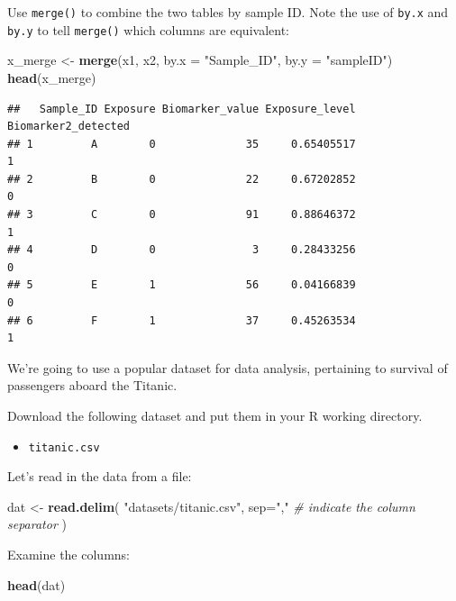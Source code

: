 \documentclass[
]{book}
\newenvironment{Shaded}{\begin{snugshade}}{\end{snugshade}}
\newcommand{\AttributeTok}[1]{\textcolor[rgb]{0.13,0.29,0.53}{#1}}
\newcommand{\CommentTok}[1]{\textcolor[rgb]{0.56,0.35,0.01}{\textit{#1}}}
\newcommand{\FunctionTok}[1]{\textcolor[rgb]{0.13,0.29,0.53}{\textbf{#1}}}
\newcommand{\NormalTok}[1]{#1}
\newcommand{\OtherTok}[1]{\textcolor[rgb]{0.56,0.35,0.01}{#1}}
\newcommand{\StringTok}[1]{\textcolor[rgb]{0.31,0.60,0.02}{#1}}
\providecommand{\tightlist}{%
  \setlength{\itemsep}{0pt}\setlength{\parskip}{0pt}}
\begin{document}
Use \texttt{merge()} to combine the two tables by sample ID. Note the use of \texttt{by.x} and \texttt{by.y} to tell \texttt{merge()} which columns are equivalent:

\begin{Shaded}
\begin{Highlighting}[]
\NormalTok{x\_merge }\OtherTok{\textless{}{-}} \FunctionTok{merge}\NormalTok{(x1, x2, }\AttributeTok{by.x =} \StringTok{"Sample\_ID"}\NormalTok{, }\AttributeTok{by.y =} \StringTok{"sampleID"}\NormalTok{)}
\FunctionTok{head}\NormalTok{(x\_merge)}
\end{Highlighting}
\end{Shaded}

\begin{verbatim}
##   Sample_ID Exposure Biomarker_value Exposure_level Biomarker2_detected
## 1         A        0              35     0.65405517                   1
## 2         B        0              22     0.67202852                   0
## 3         C        0              91     0.88646372                   1
## 4         D        0               3     0.28433256                   0
## 5         E        1              56     0.04166839                   0
## 6         F        1              37     0.45263534                   1
\end{verbatim}

We're going to use a popular dataset for data analysis, pertaining to survival of passengers aboard the Titanic.

Download the following dataset and put them in your R working directory.

\begin{itemize}
\tightlist
\item
  \texttt{titanic.csv}
\end{itemize}

Let's read in the data from a file:

\begin{Shaded}
\begin{Highlighting}[]
\NormalTok{dat }\OtherTok{\textless{}{-}} \FunctionTok{read.delim}\NormalTok{(}
    \StringTok{"datasets/titanic.csv"}\NormalTok{,}
    \AttributeTok{sep=}\StringTok{","} \CommentTok{\# indicate the column separator}
\NormalTok{    ) }
\end{Highlighting}
\end{Shaded}

Examine the columns:

\begin{Shaded}
\begin{Highlighting}[]
\FunctionTok{head}\NormalTok{(dat)}
\end{Highlighting}
\end{Shaded}
\end{document}
